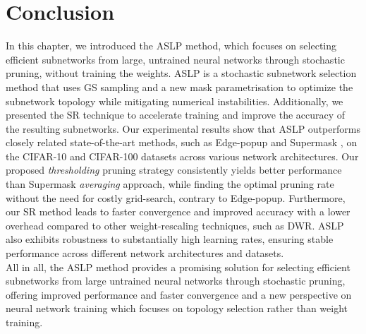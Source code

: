 \section{Conclusion}\label{sec:chap2:conclusion}

In this chapter, we introduced the \acl{ASLP} method, which focuses on selecting
efficient subnetworks from large, untrained neural networks through stochastic
pruning, without training the weights. \acl{ASLP} is a stochastic subnetwork
selection method that uses \acl{GS} sampling and a new mask parametrisation to
optimize the subnetwork topology while mitigating numerical instabilities.
Additionally, we presented the \acl{SR} technique to accelerate training and
improve the accuracy of the resulting subnetworks. Our experimental results show
that \ac{ASLP} outperforms closely related state-of-the-art methods, such as
Edge-popup \cite{DBLP:conf/cvpr/RamanujanWKFR20} and Supermask
\cite{DBLP:conf/nips/ZhouLLY19}, on the CIFAR-10 and CIFAR-100 datasets across
various network architectures. Our proposed \textit{thresholding} pruning
strategy consistently yields better performance than Supermask
\textit{averaging} approach, while finding the optimal pruning rate without the
need for costly grid-search, contrary to Edge-popup. Furthermore, our \acl{SR}
method leads to faster convergence and improved accuracy with a lower overhead
compared to other weight-rescaling techniques, such as \acl{DWR}. \acl{ASLP}
also exhibits robustness to substantially high learning rates, ensuring stable
performance across different network architectures and datasets.\\

All in all, the \acl{ASLP} method provides a promising solution for selecting
efficient subnetworks from large untrained neural networks through stochastic
pruning, offering improved performance and faster convergence and a new
perspective on neural network training which focuses on topology selection
rather than weight training.\\


